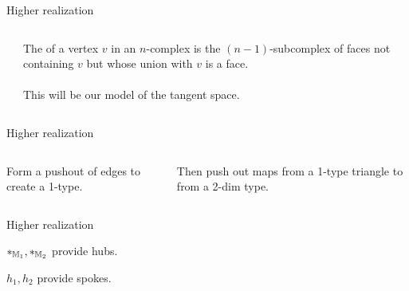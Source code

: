 \documentclass[14pt,aspectratio=169,compress]{beamer}
\begin{document}
\begin{frame}{Higher realization}
\begin{columns}
\begin{column}{0.5\textwidth}

\end{column}
\begin{column}{0.5\textwidth}
The  of a vertex \( v \) in an \( n \)-complex is the \( (n-1) \)-subcomplex of faces not containing \( v \) but whose union with \( v \) is a face.\\~\\

This will be our model of the tangent space.
\end{column}
\end{columns}
\end{frame}

\begin{frame}[c]{Higher realization}
\begin{columns}[T]
\begin{column}{0.4\textwidth}
\begin{minipage}[t][0.7\textheight]{\textwidth}


\vspace{\fill}
Form a pushout of edges to create a 1-type.
\end{minipage}
\end{column}
\begin{column}{0.6\textwidth}
\begin{minipage}[t][0.7\textheight]{\textwidth}


\vspace{\fill}
Then push out maps from a 1-type triangle to from a 2-dim type.
\end{minipage}
\end{column}
\end{columns}
\end{frame}

\begin{frame}{Higher realization}


\( *_{\mathbb{M}_1}, *_{\mathbb{M}_2} \) provide \alert{hubs}.

\( h_1, h_2 \) provide \alert{spokes}.
\end{frame}
\end{document}
